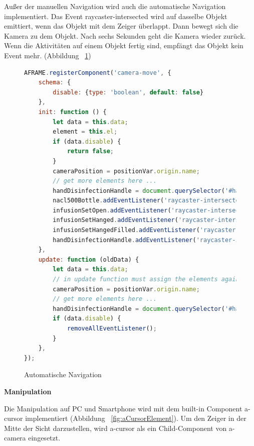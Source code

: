   Außer der manuellen Navigation wird auch die automatische Navigation implementiert. Das Event {\selectfont raycaster-intersected} wird auf dasselbe Objekt emittiert, wenn das Objekt mit dem Zeiger überlappt. Dann bewegt sich die Kamera zu dem Objekt. Nach sechs Sekunden geht die Kamera wieder zurück. Wenn die Aktivitäten auf einem Objekt fertig sind, empfängt das Objekt kein Event mehr. (Abbildung ~\ref{fig:cameraMove})
  
\begin{figure}[ht]
\vspace*{1em}
\centering
\caption[Automatische Navigation]{Automatische Navigation}
\begin{lstlisting}[language=JavaScript, style=htmlcssjs]
AFRAME.registerComponent('camera-move', {
    schema: {
        disable: {type: 'boolean', default: false}
    },
    init: function () {
        let data = this.data;
        element = this.el;
        if (data.disable) {
            return false;
        }
        cameraPosition = positionVar.origin.name;
        // get more elements here ...
        handDisinfectionHandle = document.querySelector('#handDisinfectionHandle');
        nacl500Bottle.addEventListener('raycaster-intersected', moveToCupboardAndBack);
        infusionSetOpen.addEventListener('raycaster-intersected', moveToCabinetAndBack);
        infusionSetHanged.addEventListener('raycaster-intersected', moveToHolderAndBack);
        infusionSetHangedFilled.addEventListener('raycaster-intersected', moveToHolderAndBack);
        handDisinfectionHandle.addEventListener('raycaster-intersected', moveToHandDisinfectionAndBack);
    },
    update: function (oldData) {
        let data = this.data;
        // in update function must assign the elements again
        cameraPosition = positionVar.origin.name;
        // get more elements here ...
        handDisinfectionHandle = document.querySelector('#handDisinfectionHandle');
        if (data.disable) {
            removeAllEventListener();
        }
    },
});

\end{lstlisting}
\label{fig:cameraMove} 
\end{figure}
  
  \vspace{1em}
  \noindent
  \textbf{Manipulation}
  \vspace{1em}
  
  \noindent
  Die Manipulation auf PC und Smartphone wird mit dem built-in Component {\selectfont a-cursor} implementiert (Abbildung ~\ref{fig:aCursorElement}). Um den Zeiger in der Mitte der Sicht darzustellen, wird {\selectfont a-cursor} als ein Child-Component von {\selectfont a-camera} eingesetzt.
  
